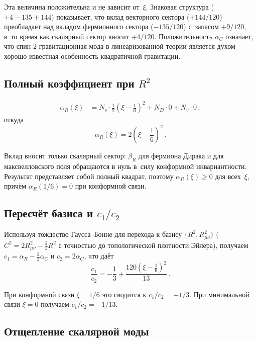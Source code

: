 \documentclass[12pt,a4paper]{article}
\begin{document}
Эта величина положительна и не зависит от~$\xi$. Знаковая структура
($+4 - 135 + 144$) показывает, что вклад векторного сектора ($+144/120$)
преобладает над вкладом фермионного сектора ($-135/120$) с~запасом $+9/120$,
в~то время как скалярный сектор вносит $+4/120$. Положительность $\alpha_C$
означает, что спин-2 гравитационная мода в линеаризованной теории является
духом~\cite{Stelle:1976gc} --- хорошо известная особенность квадратичной
гравитации.

\subsection{Полный коэффициент при \texorpdfstring{$R^2$}{R2}}

\begin{align}
  \alpha_R(\xi) &= N_s \cdot \frac{1}{2}\!\left(\xi - \frac{1}{6}\right)^{\!2}
    + N_D \cdot 0 + N_v \cdot 0\,,
\end{align}
откуда
\begin{equation}
  \boxed{\alpha_R(\xi) = 2\!\left(\xi - \frac{1}{6}\right)^{\!2}\,.}
  \label{eq:alphaR}
\end{equation}

Вклад вносит только скалярный сектор: $\beta_R$ для фермиона Дирака и
для максвелловского поля обращаются в нуль в~силу конформной инвариантности.
Результат представляет собой полный квадрат, поэтому
$\alpha_R(\xi) \geq 0$ для всех~$\xi$, причём $\alpha_R(1/6) = 0$ при
конформной связи.

\subsection{Пересчёт базиса и \texorpdfstring{$c_1/c_2$}{c1/c2}}

Используя тождество Гаусса--Бонне для перехода к базису
$\{R^2, R_{\mu\nu}^2\}$ ($C^2 = 2R_{\mu\nu}^2 - \frac{2}{3}R^2$ с точностью
до топологической плотности Эйлера), получаем $c_1 = \alpha_R - \frac{2}{3}\alpha_C$
и $c_2 = 2\alpha_C$, что даёт
\begin{equation}
  \boxed{\frac{c_1}{c_2} = -\frac{1}{3}
    + \frac{120\!\left(\xi - \frac{1}{6}\right)^{\!2}}{13}\,.}
  \label{eq:c1c2}
\end{equation}

При конформной связи $\xi = 1/6$ это сводится к $c_1/c_2 = -1/3$. При
минимальной связи $\xi = 0$ получаем $c_1/c_2 = -1/13$.

\subsection{Отщепление скалярной моды}
\end{document}
